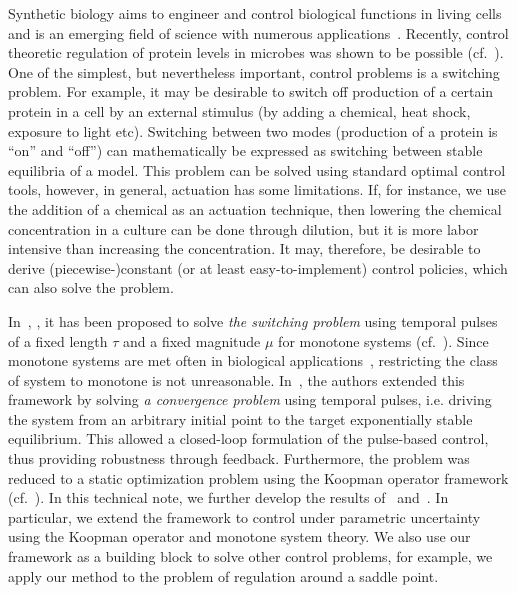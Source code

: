 \documentclass[letterpaper, 10pt, journal]{IEEEtran}  %
\begin{document}
Synthetic biology aims to engineer and control biological functions in living cells and is an emerging field of science with numerous applications~\cite{Purnick:2009}. Recently, control theoretic regulation of protein levels in microbes was shown to be possible (cf.~\cite{milias2011silico, uhlendorf2012long}). One of the simplest, but nevertheless important, control problems is a switching problem. For example, it may be desirable to switch off production of a certain protein in a cell by an external stimulus (by adding a chemical, heat shock, exposure to light etc). Switching between two modes (production of a protein is ``on'' and ``off'') can mathematically be expressed as switching between stable equilibria of a model. This problem can be solved using standard optimal control tools, however, in general, actuation has some limitations. If, for instance, we use the addition of a chemical as an actuation technique, then lowering the chemical concentration in a culture can be done through dilution, but it is more labor intensive than increasing the concentration. It may, therefore, be desirable to derive (piecewise-)constant (or at least easy-to-implement) control policies, which can also solve the problem. 

In~\cite{sootla2015pulsesaut}, \cite{sootla2016nolcos}, it has been proposed to solve \emph{the switching problem} using temporal pulses of a fixed length $\tau$ and a fixed magnitude $\mu$ for monotone systems (cf.~\cite{angeli2003monotone}). Since monotone systems are met often in biological applications~\cite{sontag2007monotone}, restricting the class of system to monotone is not unreasonable. In~\cite{sootla2016optimalswitching}, the authors extended this framework by solving \emph{a convergence problem} using temporal pulses, i.e. driving the system from an arbitrary initial point to the target exponentially stable equilibrium. This allowed a closed-loop formulation of the pulse-based control, thus providing robustness through feedback. Furthermore, the problem was reduced to a static optimization problem using the Koopman operator framework (cf.~\cite{mezic2005}). In this technical note, we further develop the results of~\cite{sootla2015pulsesaut} and~\cite{sootla2016optimalswitching}. In particular, we extend the framework to control under parametric uncertainty using the Koopman operator and monotone system theory. We also use our framework as a building block to solve other control problems, for example, we apply our method to the problem of regulation around a saddle point. 
\end{document}
